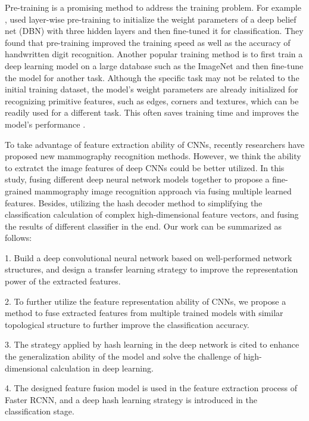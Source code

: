 \documentclass[12pt]{article}
\begin{document}
Pre-training is a promising method to address the 
training problem. For example 
\citep{Hinton2006,Li2020},
used layer-wise pre-training to initialize the 
weight parameters of a deep belief net (DBN) with 
three hidden layers and then fine-tuned it for 
classification. They found that pre-training 
improved the training speed as well as the 
accuracy of handwritten digit recognition. Another 
popular training method is to first train a deep 
learning model on a large database such as the 
ImageNet 
\citep{Russakovsky2015,LiZhou2020}
and then fine-tune the model for another task. 
Although the specific task may not be related to 
the initial training dataset, the model’s weight 
parameters are already initialized for recognizing 
primitive features, such as edges, corners and 
textures, which can be readily used for a different 
task. This often saves training time and improves 
the model’s performance
\citep{He2016,Moreira2018}.

To take advantage of feature extraction ability of 
CNNs, recently researchers have proposed new 
mammography recognition methods. However, we think 
the ability to extratct the image features of 
deep CNNs could be better utilized. In this study, fusing 
different deep neural network models together to 
propose a fine-grained mammography image 
recognition approach via fusing multiple learned
features. Besides, utilizing the hash decoder
method to simplifying the classification 
calculation of complex high-dimensional 
feature vectors, and fusing the results of 
different classifier in the end. Our work can 
be summarized as follows:

1. Build a deep convolutional neural network based 
on well-performed network structures, and design a 
transfer learning strategy to improve the 
representation power of the extracted features.


2. To further utilize the feature representation 
ability of CNNs, we propose a method to fuse 
extracted features from multiple trained models 
with similar topological structure to
further improve the classification accuracy.

3. The strategy applied by hash learning in the 
deep network is cited to enhance the 
generalization ability of the model and solve the 
challenge of high-dimensional calculation 
in deep learning.

4. The designed feature fusion model is used in 
the feature extraction process of Faster RCNN, 
and a deep hash learning strategy is introduced 
in the classification stage.
\end{document}
